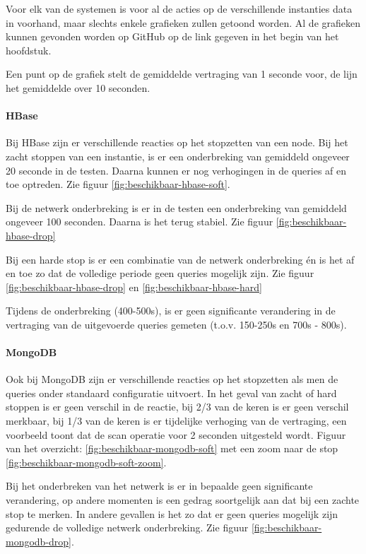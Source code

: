 Voor elk van de systemen is voor al de acties op de verschillende instanties data in voorhand, maar slechts enkele grafieken zullen getoond worden. Al de grafieken kunnen gevonden worden op GitHub op de link gegeven in het begin van het hoofdstuk. 

Een punt op de grafiek stelt de gemiddelde vertraging van 1 seconde voor, de lijn het gemiddelde over 10 seconden. 

\paragraph{HBase}
Bij HBase zijn er verschillende reacties op het stopzetten van een node. Bij het zacht stoppen van een instantie, is er een onderbreking van gemiddeld ongeveer 20 seconde in de testen. Daarna kunnen er nog verhogingen in de queries af en toe optreden. Zie figuur \ref{fig:beschikbaar-hbase-soft}. 

Bij de netwerk onderbreking is er in de testen een onderbreking van gemiddeld ongeveer 100 seconden. Daarna is het terug stabiel. Zie figuur \ref{fig:beschikbaar-hbase-drop}

Bij een harde stop is er een combinatie van de netwerk onderbreking én is het af en toe zo dat de volledige periode geen queries mogelijk zijn. Zie figuur \ref{fig:beschikbaar-hbase-drop} en \ref{fig:beschikbaar-hbase-hard}

Tijdens de onderbreking (400-500s), is er geen significante verandering in de vertraging van de uitgevoerde queries gemeten (t.o.v. 150-250s en 700s - 800s). 


\paragraph{MongoDB}
Ook bij MongoDB zijn er verschillende reacties op het stopzetten als men de queries onder standaard configuratie uitvoert. In het geval van zacht of hard stoppen is er geen verschil in de reactie, bij 2/3 van de keren is er geen verschil merkbaar, bij 1/3 van de keren is er tijdelijke verhoging van de vertraging, een voorbeeld toont dat de scan operatie voor 2 seconden uitgesteld wordt. Figuur van het overzicht: \ref{fig:beschikbaar-mongodb-soft} met een zoom naar de stop \ref{fig:beschikbaar-mongodb-soft-zoom}.

Bij het onderbreken van het netwerk is er in bepaalde geen significante verandering, op andere momenten is een gedrag soortgelijk aan dat bij een zachte stop te merken. In andere gevallen is het zo dat er geen queries mogelijk zijn gedurende de volledige netwerk onderbreking. Zie figuur \ref{fig:beschikbaar-mongodb-drop}. 

